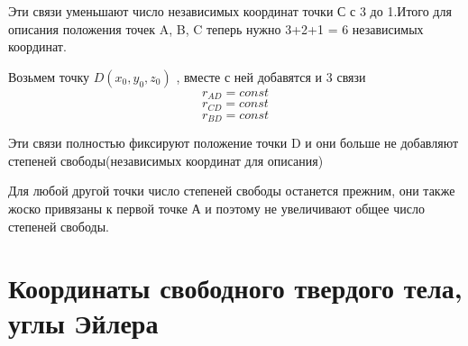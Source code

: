 Эти связи уменьшают число независимых координат точки С с 3 до 1.Итого для описания положения точек A, B, C теперь нужно 3+2+1 = 6 независимых координат.

Возьмем точку $D(x_0,y_0,z_0)$ , вместе с ней добавятся и 3 связи
\[ r_{AD} = const\]
\[ r_{CD} = const\]
\[ r_{BD} = const\]

Эти связи полностью фиксируют положение точки D и они больше не добавляют степеней свободы(независимых координат для описания)

Для любой другой точки число степеней свободы останется прежним, они также жоско привязаны к первой точке А и поэтому не увеличивают общее число степеней свободы.

\section{Координаты свободного твердого тела, углы Эйлера}


